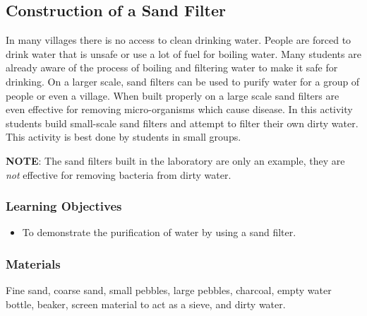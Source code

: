 \subsection{Construction of a Sand Filter}
In many villages there is no access to clean drinking water. People are forced to drink water that is unsafe or use a lot of fuel for boiling water. Many students are already aware of the process of boiling and filtering water to make it safe for drinking. On a larger scale, sand filters can be used to purify water for a group of people or even a village. When built properly on a large scale sand filters are even effective for removing micro-organisms which cause disease. In this activity students build small-scale sand filters and attempt to filter their own dirty water.  This activity is best done by students in small groups.

\textbf{NOTE}: The sand filters built in the laboratory are only an example, they are \textit{not} effective for removing bacteria from dirty water.
\subsubsection*{Learning Objectives}
\begin{itemize}
\item{To demonstrate the purification of water by using a sand filter.}
\end{itemize}

\subsubsection*{Materials}
Fine sand, coarse sand, small pebbles, large pebbles, charcoal, empty water bottle, beaker, screen material to act as a sieve, and dirty water.

